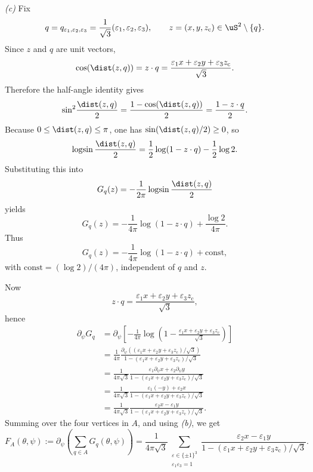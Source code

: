 \smallskip
\noindent\emph{(c)} Fix
\[
q=q_{\varepsilon_1,\varepsilon_2,\varepsilon_3}
=\frac{1}{\sqrt3}(\varepsilon_1,\varepsilon_2,\varepsilon_3),
\qquad
z=(x,y,z_{\mathrm c})\in \uS^2\setminus\{q\}.
\]
Since \(z\) and \(q\) are unit vectors,
\[
\cos(\dist(z,q))=z\cdot q
=\frac{\varepsilon_1 x+\varepsilon_2 y+\varepsilon_3 z_{\mathrm c}}{\sqrt3}.
\]
Therefore the half-angle identity gives
\[
\sin^2\!\frac{\dist(z,q)}{2}
=\frac{1-\cos(\dist(z,q))}{2}
=\frac{1-z\cdot q}{2}.
\]
Because \(0\le \dist(z,q)\le \pi\), one has \(\sin(\dist(z,q)/2)\ge 0\), so
\[
\log\!\sin\frac{\dist(z,q)}{2}
=\frac12\log(1-z\cdot q)-\frac12\log 2.
\]
Substituting this into
\[
G_q(z)=-\frac{1}{2\pi}\log\!\sin\frac{\dist(z,q)}{2}
\]
yields
\[
G_q(z)
=-\frac{1}{4\pi}\log(1-z\cdot q)+\frac{\log 2}{4\pi}.
\]
Thus
\[
G_q(z)=-\frac{1}{4\pi}\log(1-z\cdot q)+\mathrm{const},
\]
with \(\mathrm{const}=(\log 2)/(4\pi)\), independent of \(q\) and \(z\).

Now
\[
z\cdot q=\frac{\varepsilon_1 x+\varepsilon_2 y+\varepsilon_3 z_{\mathrm c}}{\sqrt3},
\]
hence
\begin{align*}
\partial_\psi G_q
&=
\partial_\psi\!\left[
-\frac{1}{4\pi}
\log\!\left(
1-\frac{\varepsilon_1 x+\varepsilon_2 y+\varepsilon_3 z_{\mathrm c}}{\sqrt3}
\right)
\right] \\
&=
\frac{1}{4\pi}
\frac{\partial_\psi\!\left((\varepsilon_1 x+\varepsilon_2 y+\varepsilon_3 z_{\mathrm c})/\sqrt3\right)}
{1-(\varepsilon_1 x+\varepsilon_2 y+\varepsilon_3 z_{\mathrm c})/\sqrt3} \\
&=
\frac{1}{4\pi\sqrt3}
\frac{\varepsilon_1\partial_\psi x+\varepsilon_2\partial_\psi y}
{1-(\varepsilon_1 x+\varepsilon_2 y+\varepsilon_3 z_{\mathrm c})/\sqrt3} \\
&=
\frac{1}{4\pi\sqrt3}
\frac{\varepsilon_1(-y)+\varepsilon_2 x}
{1-(\varepsilon_1 x+\varepsilon_2 y+\varepsilon_3 z_{\mathrm c})/\sqrt3} \\
&=
\frac{1}{4\pi\sqrt3}
\frac{\varepsilon_2 x-\varepsilon_1 y}
{1-(\varepsilon_1 x+\varepsilon_2 y+\varepsilon_3 z_{\mathrm c})/\sqrt3}.
\end{align*}
Summing over the four vertices in \(A\), and using \emph{(b)}, we get
\[
F_A(\theta,\psi)
:=
\partial_\psi\!\left(\sum_{q\in A} G_q(\theta,\psi)\right)
=
\frac{1}{4\pi\sqrt3}
\sum_{\substack{\varepsilon\in\{\pm1\}^3\\ \varepsilon_1\varepsilon_3=1}}
\frac{\varepsilon_2 x-\varepsilon_1 y}
{1-(\varepsilon_1 x+\varepsilon_2 y+\varepsilon_3 z_{\mathrm c})/\sqrt3}.
\]


